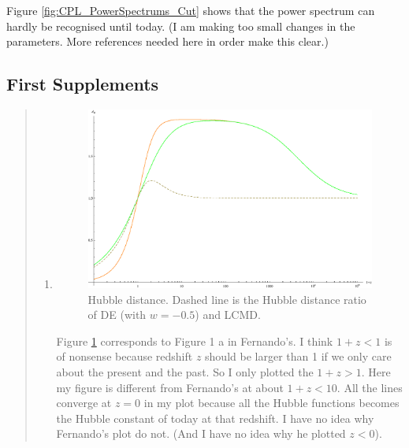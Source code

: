 \documentclass{article}
\begin{document}
Figure \ref{fig:CPL_PowerSpectrums_Cut} shows that the power spectrum can hardly be recognised until today. (I am making too small changes in the parameters. More references needed here in order make this clear.)








\subsection{\color{blue}First Supplements}


\begin{quotation}
{\color{blue}


\begin{enumerate}

\item\label{item:HubbleDistance}

\begin{figure}[!htpb]
\centering
\includegraphics[width=350pt]{DE_Supp_HubbleDistances.eps}
\caption{\color{blue}Hubble distance. Dashed line is the Hubble distance ratio of DE (with $w=-0.5$) and LCMD.}\label{fig:DE_Supp_HubbleDistances}
\end{figure}

Figure \ref{fig:DE_Supp_HubbleDistances} corresponds to Figure 1 {a} in Fernando's. I think $1+z<1$ is of nonsense because redshift $z$ should be larger than 1 if we only care about the present and the past. So I only plotted the $1+z>1$. Here my figure is different from Fernando's at about $1+z<10$. All the lines converge at $z=0$ in my plot because all the Hubble functions becomes the Hubble constant of today at that redshift. I have no idea why Fernando's plot do not. (And I have no idea why he plotted $z<0$).



\end{enumerate}}
\end{quotation}
\end{document}
